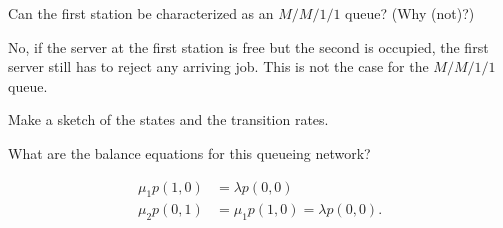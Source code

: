 
\begin{exercise}[201704]
  Can the first station be characterized as an $M/M/1/1$ queue? (Why (not)?)
\begin{solution}
    No, if the server at the first station is free but the second is occupied, the first server still has to reject any arriving job. This is not the case for the $M/M/1/1$ queue.
\end{solution}
\end{exercise}

\begin{exercise}[201704]{2}
Make a sketch of the states and the transition rates.
\begin{solution}
  \begin{center}
    
  \end{center}
\end{solution}
\end{exercise}

\begin{exercise}[201704]{2}
What are the balance equations for this queueing network?
\begin{solution}
  \begin{align*}
    \mu_1 p(1,0) &= \lambda p(0,0) \\
    \mu_2 p(0,1) &= \mu_1 p(1,0) = \lambda p(0,0).
  \end{align*}
\end{solution}
\end{exercise}


